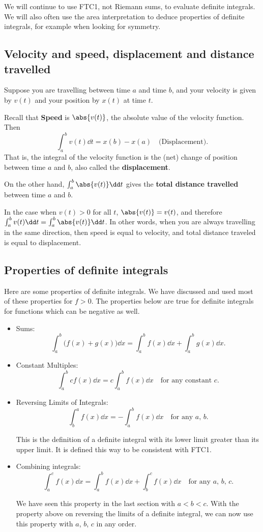 We will continue to use FTC1, not Riemann sums, to evaluate definite integrals. We will also often use the area interpretation to deduce properties of definite integrals, for example when looking for symmetry.
\subsection{Velocity and speed, displacement and distance travelled}
Suppose you are travelling between time $a$ and time $b$, and your velocity is given by $v(t)$ and your position by $x(t)$ at time $t$.

Recall that \textbf{Speed} is $\abs{v(t)}$, the absolute value of the velocity function. Then
\[\int_a^bv(t)\dd t=x(b)-x(a)\quad\text{(Displacement)}.\]
That is, the integral of the velocity function is the (net) change of position between time $a$ and $b$, also called the \textbf{displacement}.

On the other hand, $\int_a^b\abs{v(t)}\dd t$ gives the \textbf{total distance travelled} between time $a$ and $b$.

In the case when $v(t)>0$ for all $t$, $\abs{v(t)}=v(t)$, and therefore $\int_a^bv(t)\dd t=\int_a^b\abs{v(t)}\dd t$. In other words, when you are always travelling in the same direction, then speed is equal to velocity, and total distance traveled is equal to displacement.
\subsection{Properties of definite integrals}
Here are some properties of definite integrals. We have discussed and used most of these properties for $f>0$. The properties below are true for definite integrals for functions which can be negative as well.
\begin{itemize}
\item Sums: \[\int_a^b\lparen f(x)+g(x)\rparen\dd x=\int_a^bf(x)\dd x+\int_a^bg(x)\dd x.\]
\item Constant Multiples: \[\int_a^bcf(x)\dd x=c\int_a^bf(x)\dd x\quad\text{for any constant $c$}.\]
\item Reversing Limits of Integrals: \[\int_b^af(x)\dd x=-\int_a^bf(x)\dd x\quad\text{for any $a$, $b$}.\]
  \begin{note}
    This is the definition of a definite integral with its lower limit greater than its upper limit. It is defined this way to be consistent with FTC1.
  \end{note}
\item Combining integrals: \[\int_a^cf(x)\dd x=\int_a^bf(x)\dd x+\int_b^cf(x)\dd x\quad\text{for any $a$, $b$, $c$}.\]
  \begin{note}We have seen this property in the last section with $a<b<c$. With the property above on reversing the limits of a definite integral, we can now use this property with $a$, $b$, $c$ in any order.\end{note}
\end{itemize}
